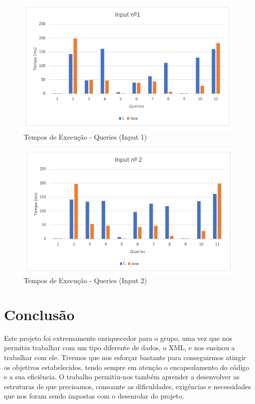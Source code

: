\documentclass[a4paper, 11pt, oneside]{article}
\begin{document}
\begin{figure}[h] 
\centering
\includegraphics[scale=.5]{input_1.png}
\caption{Tempos de Execução - Queries (Input 1) \label{graphQs1}}
\end{figure}

\begin{figure}[h] 
\centering
\includegraphics[scale=.5]{input_2.png}
\caption{Tempos de Execução - Queries (Input 2) \label{graphQs2}}
\end{figure}

\newpage
\section{Conclusão}




Este projeto foi extremamente enriquecedor para o grupo, uma vez que nos permitiu trabalhar com um tipo diferente de dados, o XML, e nos ensinou a trabalhar com ele. 
Tivemos que nos esforçar bastante para conseguirmos atingir os objetivos estabelecidos, tendo sempre em atenção o encapsulamento do código e a sua eficiência. O trabalho 
permitiu-nos também aprender a desenvolver as estruturas de que precisamos, consoante as dificuldades, exigências e necessidades que nos foram sendo impostas com o 
desenrolar do projeto.
\end{document}
